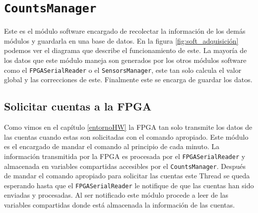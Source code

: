 \section{\texttt{CountsManager}}
	Este es el módulo software encargado de recolectar la información de los demás módulos y guardarla en una base de datos. En la figura
	\ref{fig:soft_adquisición} podemos ver el diagrama que describe el funcionamiento de este. La mayoría de los datos que este módulo maneja son
	generados por los otros módulos software como el \texttt{FPGASerialReader} o el \texttt{SensorsManager}, este tan solo calcula el valor global
	y las correcciones de este. Finalmente este se encarga de guardar los datos. 
	\subsection{Solicitar cuentas a la FPGA}
		Como vimos en el capítulo \ref{entornoHW} la FPGA tan solo transmite los datos de las cuentas cuando estas son solicitadas con el
		comando apropiado. Este módulo es el encargado de mandar el comando al principio de cada minuto. La información transmitida por la
		FPGA es procesada por el \texttt{FPGASerialReader} y almacenada en variables compartidas accesibles por el \texttt{CountsManager}.
		Después de mandar el comando apropiado para solicitar las cuentas este Thread se queda esperando hasta que el
		\texttt{FPGASerialReader} le notifique de que las cuentas han sido enviadas y procesadas. Al ser notificado este módulo procede a leer
		de las variables compartidas donde está almacenada la información de las cuentas.
